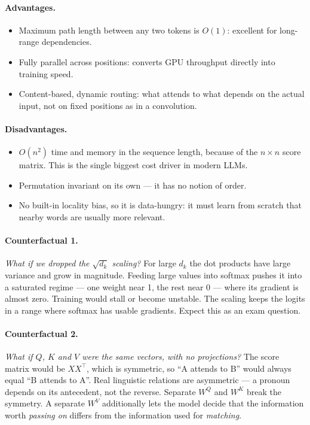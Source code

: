 \documentclass[11pt,a4paper]{article}
\begin{document}
\paragraph{Advantages.}
\begin{itemize}
\item Maximum path length between any two tokens is $O(1)$: excellent for long-range
  dependencies.
\item Fully parallel across positions: converts GPU throughput directly into training speed.
\item Content-based, dynamic routing: what attends to what depends on the actual input, not
  on fixed positions as in a convolution.
\end{itemize}

\paragraph{Disadvantages.}
\begin{itemize}
\item $O(n^2)$ time and memory in the sequence length, because of the $n \times n$ score
  matrix. This is the single biggest cost driver in modern LLMs.
\item Permutation invariant on its own --- it has no notion of order.
\item No built-in locality bias, so it is data-hungry: it must learn from scratch that
  nearby words are usually more relevant.
\end{itemize}

\paragraph{Counterfactual 1.} \emph{What if we dropped the $\sqrt{d_k}$ scaling?} For large
$d_k$ the dot products have large variance and grow in magnitude. Feeding large values into
softmax pushes it into a saturated regime --- one weight near 1, the rest near 0 --- where
its gradient is almost zero. Training would stall or become unstable. The scaling keeps the
logits in a range where softmax has usable gradients. Expect this as an exam question.

\paragraph{Counterfactual 2.} \emph{What if $Q$, $K$ and $V$ were the same vectors, with no
projections?} The score matrix would be $XX^\top$, which is symmetric, so ``A attends to B''
would always equal ``B attends to A''. Real linguistic relations are asymmetric --- a
pronoun depends on its antecedent, not the reverse. Separate $W^Q$ and $W^K$ break the
symmetry. A separate $W^V$ additionally lets the model decide that the information worth
\emph{passing on} differs from the information used for \emph{matching}.
\end{document}
